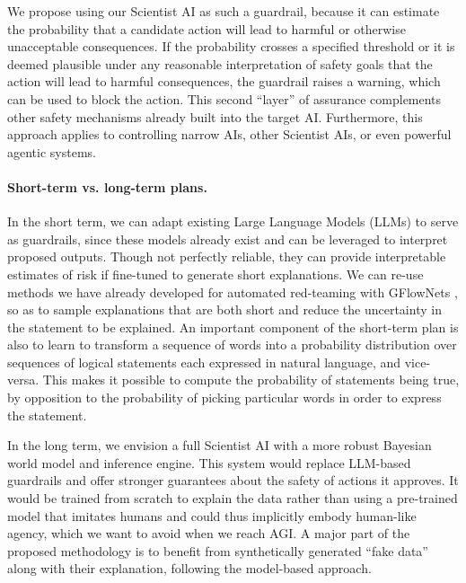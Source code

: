 We propose using our Scientist AI as such a guardrail, because it can estimate the probability that a candidate action will lead to harmful or otherwise unacceptable consequences. If the probability crosses a specified threshold or it is deemed plausible under any reasonable interpretation of safety goals that the action will lead to harmful consequences, the guardrail raises a warning, which can be used to block the action. This second ``layer'' of assurance complements other safety mechanisms already built into the target AI. Furthermore, this approach applies to controlling narrow AIs, other Scientist AIs, or even powerful agentic systems.

\paragraph{Short-term vs. long-term plans.} In the short term, we can adapt existing Large Language Models (LLMs) to serve as guardrails, since these models already exist and can be leveraged to interpret proposed outputs. Though not perfectly reliable, they can provide interpretable estimates of risk if fine-tuned to generate short explanations. We can re-use methods we have already developed for automated red-teaming with GFlowNets \cite{openreview.net.forum.id.1mXufFuv95}, so as to sample explanations that are both short and reduce the uncertainty in the statement to be explained. An important component of the short-term plan is also to learn to transform a sequence of words into a probability distribution over sequences of logical statements each expressed in natural language, and vice-versa. This makes it possible to compute the probability of statements being true, by opposition to the probability of picking particular words in order to express the statement.

In the long term, we envision a full Scientist AI with a more robust Bayesian world model and inference engine. This system would replace LLM-based guardrails and offer stronger guarantees about the safety of actions it approves. It would be trained from scratch to explain the data rather than using a pre-trained model that imitates humans and could thus implicitly embody human-like agency, which we want to avoid when we reach AGI. A major part of the proposed methodology is to benefit from synthetically generated ``fake data'' along with their explanation, following the model-based approach.

